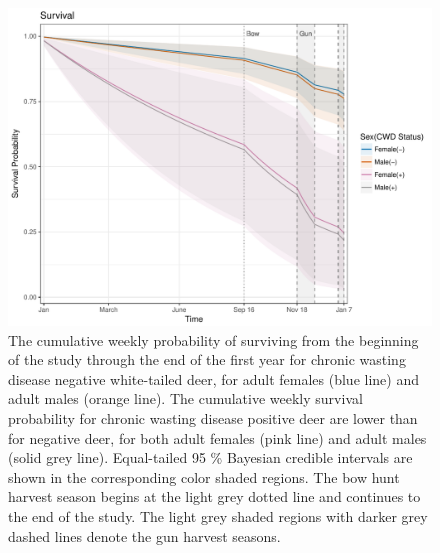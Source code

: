 \documentclass[12pt]{article}\usepackage[]{graphicx}\usepackage[]{color}
\begin{document}
\begin{figure}[H]
\begin{center}
\includegraphics[width=6 in]{figures/Survival_v8_sex}
\caption{The cumulative weekly probability of surviving from the beginning of the study through the end of the first year for chronic wasting disease negative white-tailed deer, for adult females (blue line) and adult males (orange line). The cumulative weekly survival probability for chronic wasting disease positive deer are lower than for negative deer, for both adult females (pink line) and adult males (solid grey line). Equal-tailed 95 \% Bayesian credible intervals are shown in the corresponding color shaded regions. The bow hunt harvest season begins at the light grey dotted line and continues to the end of the study. The light grey shaded regions with darker grey dashed lines denote the gun harvest seasons.}\label{fig:survival_v8}
\end{center}
\end{figure}
\end{document}
